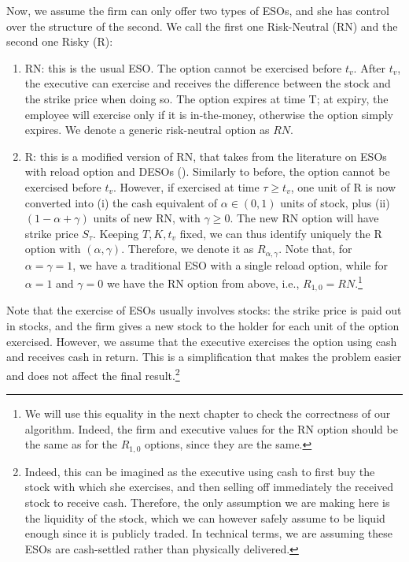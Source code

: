 Now, we assume the firm can only offer two types of ESOs, and she has control over the structure of the second. We call the first one Risk-Neutral (RN) and the second one Risky (R):
\begin{enumerate}
    \item RN: this is the usual ESO. The option cannot be exercised before $t_v$. After $t_v$, the executive can exercise and receives the difference between the stock and the strike price when doing so. The option expires at time T; at expiry, the employee will exercise only if it is in-the-money, otherwise the option simply expires. We denote a generic risk-neutral option as $RN$.
    \item R: this is a modified version of RN, that takes from the literature on ESOs with reload option and DESOs (\cite{huang2013dynamic}).
    Similarly to before, the option cannot be exercised before $t_v$. However, if exercised at time $\tau \ge t_v$, one unit of R is now converted into (i) the cash equivalent of $\alpha \in (0,1)$ units of stock, plus (ii) $(1 - \alpha + \gamma)$ units of new RN, with $\gamma \ge 0$. The new RN option will have strike price $S_\tau$. Keeping $T, K, t_v$ fixed, we can thus identify uniquely the R option with $(\alpha, \gamma)$. Therefore, we denote it as $R_{\alpha, \gamma}$. Note that, for $\alpha = \gamma = 1$, we have a traditional ESO with a single reload option, while for $\alpha = 1$ and $\gamma = 0$ we have the RN option from above, i.e., $R_{1, 0} = RN$.\footnote{We will use this equality in the next chapter to check the correctness of our algorithm. Indeed, the firm and executive values for the RN option should be the same as for the $R_{1,0}$ options, since they are the same.}
\end{enumerate}
Note that the exercise of ESOs usually involves stocks: the strike price is paid out in stocks, and the firm gives a new stock to the holder for each unit of the option exercised. 
However, we assume that the executive exercises the option using cash and receives cash in return. This is a simplification that makes the problem easier and does not affect the final result.\footnote{Indeed, this can be imagined as the executive using cash to first buy the stock with which she exercises, and then selling off immediately the received stock to receive cash. Therefore, the only assumption we are making here is the liquidity of the stock, which we can however safely assume to be liquid enough since it is publicly traded. In technical terms, we are assuming these ESOs are cash-settled rather than physically delivered.}

